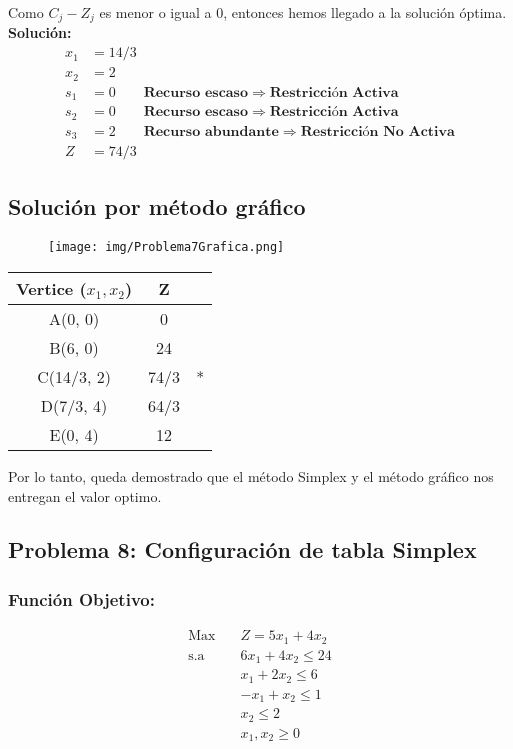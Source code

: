 \documentclass{templateNote}
\begin{document}
Como $C_j - Z_j$ es menor o igual a 0, entonces hemos llegado a la solución óptima.
\textbf{Solución:}
\begin{align*}
    x_1 &= 14/3 \\
    x_2 &= 2 \\
    s_1 &= 0 \qquad \textbf{Recurso escaso} \Rightarrow \textbf{Restricción Activa}\\
    s_2 &= 0 \qquad \textbf{Recurso escaso} \Rightarrow \textbf{Restricción Activa}\\
    s_3 &= 2 \qquad \textbf{Recurso abundante} \Rightarrow \textbf{Restricción No Activa}\\
    Z &= 74/3
\end{align*}

\subsection*{Solución por método gráfico}
\begin{figure}[H]
    \centering
    \texttt{[image: img/Problema7Grafica.png]}
\end{figure}

\begin{center}
    \begin{tabular}{|c|c|c|}
        \hline
        \textbf{Vertice ($x_1,x_2$)} & Z &  \\ \hline
        A(0, 0) & 0 & \\ \hline
        B(6, 0) & 24 & \\ \hline
        C(14/3, 2) & 74/3 & * \\ \hline
        D(7/3, 4) & 64/3 & \\ \hline
        E(0, 4) & 12 & \\ \hline
    \end{tabular}
\end{center}

Por lo tanto, queda demostrado que el método Simplex y el método gráfico nos entregan el valor optimo.
\newpage

\subsection*{Problema 8: Configuración de tabla Simplex}
\subsubsection*{Función Objetivo:}
\begin{equation*}
    \begin{aligned}
        \text{Max} \quad & Z = 5x_1 + 4x_2\\
        \text{s.a} \quad & 6x_1 + 4x_2 \leq 24 \\
        & x_1 + 2x_2 \leq 6 \\
        & -x_1 + x_2 \leq 1 \\
        & x_2 \leq 2 \\
        & x_1, x_2 \geq 0
    \end{aligned}
\end{equation*}
\end{document}
